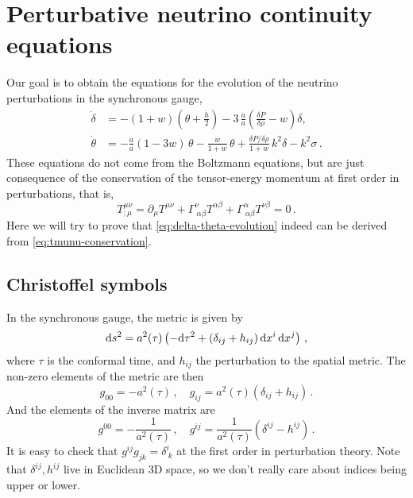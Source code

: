 \section{Perturbative neutrino continuity equations}
Our goal is to obtain the equations for the evolution of the neutrino perturbations in the synchronous gauge,
\begin{align} \nonumber
    \dot{\delta} & =-(1+w)\left(\theta+\frac{\dot{h}}{2}\right)-3\, \frac{\dot{a}}{a}\left(\frac{\delta P}{\delta \rho}-w\right) \delta, \\
    \dot{\theta} & =-\frac{\dot{a}}{a}(1-3 w)\, \theta-\frac{\dot{w}}{1+w}\, \theta+\frac{\delta P / \delta \rho}{1+w}\,  k^2 \delta-k^2 \sigma\, . \label{eq:delta-theta-evolution}
\end{align}These equations do not come from the Boltzmann equations, but are just consequence of the conservation of the tensor-energy momentum at first order in perturbations, that is,
\begin{equation}
    T_{; \mu}^{\mu \nu}=\partial_\mu T^{\mu \nu}+\Gamma_{\ \alpha \beta}^\nu T^{\alpha \beta}+\Gamma_{\ \alpha \beta}^\alpha T^{\nu \beta}=0\, . \label{eq:tmunu-conservation}
\end{equation}
Here we will try to prove that \eqref{eq:delta-theta-evolution} indeed can be derived from \eqref{eq:tmunu-conservation}.

\subsection{Christoffel symbols}
In the synchronous gauge, the metric is given by
\begin{equation}
    \mathrm{d} s^2=a^2(\tau)\left(-\mathrm{d} \tau^2+\left(\delta_{i j}+h_{i j}\right) \mathrm{d} x^i\,  \mathrm{d} x^j\right)\, ,
\end{equation}where $\tau$ is the conformal time, and $h_{ij}$ the perturbation to the spatial metric. The non-zero elements of the metric are then
\begin{equation}
    g_{00} = -a^2(\tau) \, , \quad g_{ij} = a^2(\tau)\left(\delta_{i j}+h_{i j}\right)\, .
\end{equation}And the elements of the inverse matrix are
\begin{equation}
    g^{00} = -\frac{1}{a^2(\tau)} \, , \quad 
    g^{ij} = \frac{1}{a^2(\tau)}\left(\delta^{i j}-h^{i j}\right)\, .
\end{equation}It is easy to check that $g^{ij}g_{jk} = \delta^i_{\ k}$ at the first order in perturbation theory. Note that $\delta^{ij},h^{ij}$ live in Euclidean 3D space, so we don't really care about indices being upper or lower. 

